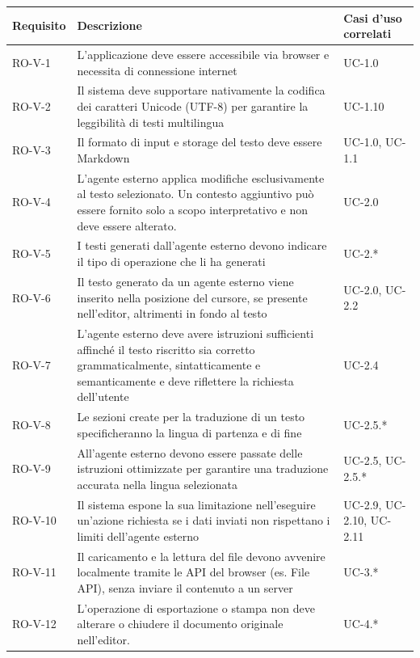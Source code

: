 \documentclass[11pt,a4paper]{article}
\begin{document}
\begin{longtable}{|p{}|>{\raggedright\arraybackslash}p{}|p{}|}
\hline
\textbf{Requisito} & \textbf{Descrizione} & \textbf{Casi d'uso correlati}\\
\hline

RO-V-1 & L'applicazione deve essere accessibile via browser e necessita di connessione internet & UC-1.0 \\
\hline
RO-V-2 & Il sistema deve supportare nativamente la codifica dei caratteri Unicode (UTF-8) per garantire la leggibilità di testi multilingua & UC-1.10 \\
\hline
RO-V-3 & Il formato di input e storage del testo deve essere Markdown & UC-1.0, UC-1.1 \\
\hline
RO-V-4 & L’agente esterno applica modifiche esclusivamente al testo selezionato. Un contesto aggiuntivo può essere fornito solo a scopo interpretativo e non deve essere alterato. & UC-2.0 \\
\hline
RO-V-5 & I testi generati dall'agente esterno devono indicare il tipo di operazione che li ha generati & UC-2.* \\
\hline
RO-V-6 & Il testo generato da un agente esterno viene inserito nella posizione del cursore, se presente nell’editor, altrimenti in fondo al testo & UC-2.0, UC-2.2 \\
\hline
RO-V-7 & L'agente esterno deve avere istruzioni sufficienti affinché il testo riscritto sia corretto grammaticalmente, sintatticamente e semanticamente e deve riflettere la richiesta dell'utente & UC-2.4 \\
\hline
RO-V-8 & Le sezioni create per la traduzione di un testo specificheranno la lingua di partenza e di fine & UC-2.5.* \\
\hline
RO-V-9 & All'agente esterno devono essere passate delle istruzioni ottimizzate per garantire una traduzione accurata nella lingua selezionata & UC-2.5, UC-2.5.* \\
\hline
RO-V-10 & Il sistema espone la sua limitazione nell'eseguire un'azione richiesta se i dati inviati non rispettano i limiti dell'agente esterno & UC-2.9, UC-2.10, UC-2.11 \\
\hline
RO-V-11 & Il caricamento e la lettura del file devono avvenire localmente tramite le API del browser (es. File API), senza inviare il contenuto a un server & UC-3.* \\
\hline
RO-V-12 & L'operazione di esportazione o stampa non deve alterare o chiudere il documento originale nell'editor. & UC-4.* \\

\end{longtable}
\end{document}
